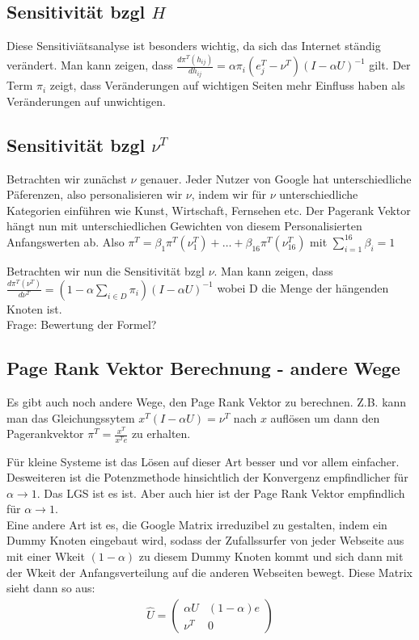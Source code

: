 \documentclass[]{article}
\begin{document}
\subsection*{Sensitivität bzgl $H$}
Diese Sensitiviätsanalyse ist besonders wichtig, da sich das Internet ständig verändert. Man kann zeigen, dass $\frac{d \pi^T(h_{ij})}{d h_{ij}}= \alpha \pi_i (e_j^T-\nu^T)(I-\alpha U)^{-1}$ gilt. Der Term $\pi_i$ zeigt, dass Veränderungen auf wichtigen Seiten mehr Einfluss haben als Veränderungen auf unwichtigen. 

\subsection*{Sensitivität bzgl $\nu^T$}

Betrachten wir zunächst $\nu$ genauer. Jeder Nutzer von Google hat unterschiedliche Päferenzen, also personalisieren wir $\nu$, indem wir für $\nu$ unterschiedliche Kategorien einführen wie Kunst, Wirtschaft, Fernsehen etc. Der Pagerank Vektor hängt nun mit unterschiedlichen Gewichten von diesem Personalisierten Anfangswerten ab. Also $\pi^T = \beta_1 \pi^T(\nu_1^T) + \dots  + \beta_{16} \pi^T(\nu_{16}^T)$ mit $\sum_{i=1}^{16}\beta_i = 1$

Betrachten wir nun die Sensitivität bzgl $\nu$. Man kann zeigen, dass $\frac{d \pi^T(\nu^T)}{d \nu^T}= \left( 1 - \alpha \sum_{i \in D} \pi_i \right) (I - \alpha U)^{-1}$ wobei D die Menge der hängenden Knoten ist. \\

Frage: Bewertung der Formel? 
 

\subsection{Page Rank Vektor Berechnung - andere Wege}

Es gibt auch noch andere Wege, den Page Rank Vektor zu berechnen. Z.B. kann man das Gleichungssytem $x^T (I - \alpha U)= \nu^T$ nach $x$ auflösen um dann den Pagerankvektor $\pi^T= \frac{x^T}{x^T e}$ zu erhalten. 

Für kleine Systeme ist das Lösen auf dieser Art besser und vor allem einfacher. Desweiteren ist die Potenzmethode hinsichtlich der Konvergenz empfindlicher für $\alpha \rightarrow 1$. Das LGS ist es ist. Aber auch hier ist der Page Rank Vektor empfindlich für $\alpha \rightarrow 1$. \\

Eine andere Art ist es, die Google Matrix irreduzibel zu gestalten, indem ein Dummy Knoten eingebaut wird, sodass der Zufallssurfer von jeder Webseite aus mit einer Wkeit $(1-\alpha)$ zu diesem Dummy Knoten kommt und sich dann mit der Wkeit der Anfangsverteilung auf die anderen Webseiten bewegt. Diese Matrix sieht dann so aus: 
\begin{align*}
	\hat{U}= 
	\begin{pmatrix}
		\alpha U & (1-\alpha) e \\
		\nu^T & 0 
	\end{pmatrix}
\end{align*}   
\end{document}
